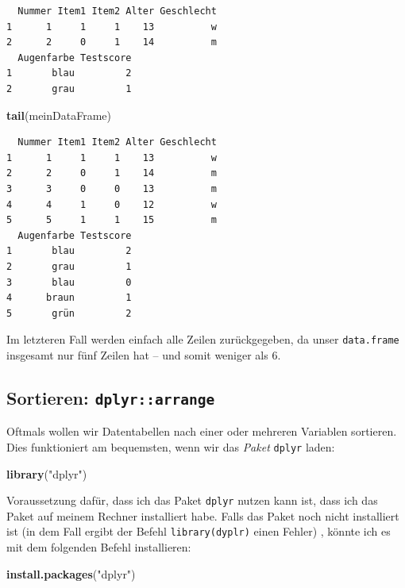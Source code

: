 \documentclass[12pt,]{tufte-book}
\newenvironment{Shaded}{\begin{snugshade}}{\end{snugshade}}
\newcommand{\KeywordTok}[1]{\textcolor[rgb]{0.13,0.29,0.53}{\textbf{#1}}}
\newcommand{\StringTok}[1]{\textcolor[rgb]{0.31,0.60,0.02}{#1}}
\newcommand{\NormalTok}[1]{#1}
\theoremstyle{definition}
\theoremstyle{definition}
\theoremstyle{definition}
\theoremstyle{remark}
\begin{document}
\begin{verbatim}
  Nummer Item1 Item2 Alter Geschlecht
1      1     1     1    13          w
2      2     0     1    14          m
  Augenfarbe Testscore
1       blau         2
2       grau         1
\end{verbatim}

\begin{Shaded}
\begin{Highlighting}[]
\KeywordTok{tail}\NormalTok{(meinDataFrame)}
\end{Highlighting}
\end{Shaded}

\begin{verbatim}
  Nummer Item1 Item2 Alter Geschlecht
1      1     1     1    13          w
2      2     0     1    14          m
3      3     0     0    13          m
4      4     1     0    12          w
5      5     1     1    15          m
  Augenfarbe Testscore
1       blau         2
2       grau         1
3       blau         0
4      braun         1
5       grün         2
\end{verbatim}

Im letzteren Fall werden einfach alle Zeilen zurückgegeben, da unser
\texttt{data.frame} insgesamt nur fünf Zeilen hat -- und somit weniger
als 6.

\subsection{\texorpdfstring{Sortieren:
\texttt{dplyr::arrange}}{Sortieren: dplyr::arrange}}\label{sortieren-dplyrarrange}

Oftmals wollen wir Datentabellen nach einer oder mehreren Variablen
sortieren. Dies funktioniert am bequemsten, wenn wir das \emph{Paket}
\texttt{dplyr} laden:

\begin{Shaded}
\begin{Highlighting}[]
\KeywordTok{library}\NormalTok{(}\StringTok{"dplyr"}\NormalTok{)}
\end{Highlighting}
\end{Shaded}

Voraussetzung dafür, dass ich das Paket \texttt{dplyr} nutzen kann ist,
dass ich das Paket auf meinem Rechner installiert habe. Falls das Paket
noch nicht installiert ist (in dem Fall ergibt der Befehl
\texttt{library(\textquotesingle{}dyplr\textquotesingle{})} einen
Fehler) , könnte ich es mit dem folgenden Befehl installieren:

\begin{Shaded}
\begin{Highlighting}[]
\KeywordTok{install.packages}\NormalTok{(}\StringTok{"dplyr"}\NormalTok{)}
\end{Highlighting}
\end{Shaded}
\end{document}
